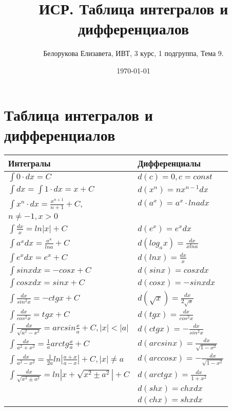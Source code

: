 \documentclass[a4paper,12pt]{article} %
\author{Белорукова Елизавета, ИВТ, 3 курс, 1 подгруппа, Тема 9.}
\title{ИСР. Таблица интегралов и дифференциалов}
\date{\today}
\begin{document}
\maketitle
\newpage
\section*{Таблица интегралов и дифференциалов}
\Large
\begin{tabular}{| l | l |}
\hline
\textbf{Интегралы} & \textbf{Дифференциалы} \\
\hline
$\int 0 \cdot dx = C$ & $d(c) = 0, c = const$\\[0.5cm]
$\int dx = \int 1 \cdot dx = x + C $ & $d(x^n) = nx^{n-1}dx$\\[0.5cm]
$\int x^n \cdot dx = \frac{x^{n+1}}{n+1} + C$, & $d(a^x) = a^x \cdot ln adx$\\
$n \neq -1, x > 0$ & \\[0.5cm]
$\int \frac{dx}{x} = ln|x| + C$ & $d(e^x) = e^xdx$\\[0.5cm]
$\int a^x dx = \frac{a^x}{ln a} + C $ & $d(log_ax) = \frac{dx}{x ln a} $\\[0.5cm]
$\int e^x dx = e^x + C $ & $d(ln x) = \frac{dx}{x} $\\[0.5cm]
$\int sinxdx = -cosx + C $ & $d(sinx) = cosxdx $\\[0.5cm]
$\int cosxdx = sinx + C $ & $d(cosx) = -sinxdx $\\[0.5cm]
$\int \frac{dx}{sin^2x} = -ctgx + C$ & $d(\sqrt{x}) = \frac{dx}{2\sqrt{x}}$\\[0.5cm]
$\int \frac{dx}{cos^2x} = tgx + C $ & $d(tgx) = \frac{dx}{cos^2x}$\\[0.5cm]
$\int \frac{dx}{\sqrt{a^2-x^2}} = arcsin\frac{x}{a} + C, |x|<|a|$ & $d(ctgx) = -\frac{dx}{sin^2x}$\\[0.5cm]
$\int \frac{dx}{a^2+x^2} = \frac{1}{a}arctg \frac{x}{a} + C $ & $d(arcsinx) = \frac{dx}{\sqrt{1-x^2}}$\\[0.5cm]
$\int \frac{dx}{a^2-x^2} = \frac{1}{2a}ln|\frac{a+x}{a-x}| + C, |x| \neq a$ & $d(arccosx)=-\frac{dx}{\sqrt{1-x^2}}$\\[0.5cm]
$\int \frac{dx}{\sqrt{x^2 \pm a^2}} = ln |x+ \sqrt{x^2\pm a^2}| + C$ & $d(arctgx)=\frac{dx}{1+x^2} $\\[0.5cm]
& $d(shx)=chxdx$ \\[0.5cm]
& $d(chx)=shxdx$ \\[0.5cm]
\hline
\end{tabular}
\end{document}
